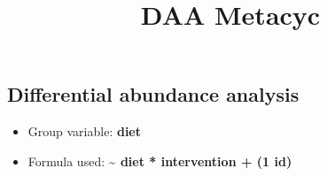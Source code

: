\documentclass[
]{article}
\title{DAA Metacyc}
\author{}
\date{}
\providecommand{\tightlist}{%
  \setlength{\itemsep}{0pt}\setlength{\parskip}{0pt}}\usepackage{longtable,booktabs,array}
\begin{document}
\maketitle


\subsection{Differential abundance
analysis}\label{differential-abundance-analysis}

\begin{itemize}
\tightlist
\item
  Group variable: \textbf{diet}
\item
  Formula used: \textbf{\textasciitilde{} diet * intervention + (1
  \textbar{} id)}
\end{itemize}
\end{document}
